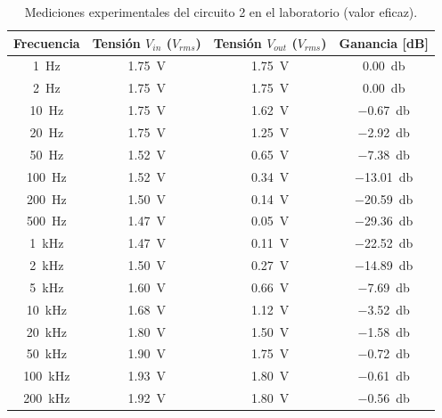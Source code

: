 \begin{table}[H]
  \centering
  \begin{tabular}{cccc}
    \hline
    \textbf{Frecuencia} & \textbf{Tensión $V_{in}$ ($V_{rms}$)} & \textbf{Tensión $V_{out}$ ($V_{rms}$)} & \textbf{Ganancia [dB]} \\ \hline
    \SI{1}{\hertz}       & \SI{1.75}{\volt}                      & \SI{1.75}{\volt}                       & \SI{0.00}{\decibel}    \\
    \SI{2}{\hertz}       & \SI{1.75}{\volt}                      & \SI{1.75}{\volt}                       & \SI{0.00}{\decibel}    \\
    \SI{10}{\hertz}      & \SI{1.75}{\volt}                      & \SI{1.62}{\volt}                       & \SI{-0.67}{\decibel}   \\
    \SI{20}{\hertz}      & \SI{1.75}{\volt}                      & \SI{1.25}{\volt}                       & \SI{-2.92}{\decibel}   \\
    \SI{50}{\hertz}      & \SI{1.52}{\volt}                      & \SI{0.65}{\volt}                       & \SI{-7.38}{\decibel}   \\
    \SI{100}{\hertz}     & \SI{1.52}{\volt}                      & \SI{0.34}{\volt}                       & \SI{-13.01}{\decibel}  \\
    \SI{200}{\hertz}     & \SI{1.50}{\volt}                      & \SI{0.14}{\volt}                       & \SI{-20.59}{\decibel}  \\
    \SI{500}{\hertz}     & \SI{1.47}{\volt}                      & \SI{0.05}{\volt}                       & \SI{-29.36}{\decibel}  \\
    \SI{1}{\kilo\hertz}  & \SI{1.47}{\volt}                      & \SI{0.11}{\volt}                       & \SI{-22.52}{\decibel}  \\
    \SI{2}{\kilo\hertz}  & \SI{1.50}{\volt}                      & \SI{0.27}{\volt}                       & \SI{-14.89}{\decibel}  \\
    \SI{5}{\kilo\hertz}  & \SI{1.60}{\volt}                      & \SI{0.66}{\volt}                       & \SI{-7.69}{\decibel}   \\
    \SI{10}{\kilo\hertz} & \SI{1.68}{\volt}                      & \SI{1.12}{\volt}                       & \SI{-3.52}{\decibel}   \\
    \SI{20}{\kilo\hertz} & \SI{1.80}{\volt}                      & \SI{1.50}{\volt}                       & \SI{-1.58}{\decibel}   \\
    \SI{50}{\kilo\hertz} & \SI{1.90}{\volt}                      & \SI{1.75}{\volt}                       & \SI{-0.72}{\decibel}   \\
    \SI{100}{\kilo\hertz}& \SI{1.93}{\volt}                      & \SI{1.80}{\volt}                       & \SI{-0.61}{\decibel}   \\
    \SI{200}{\kilo\hertz}& \SI{1.92}{\volt}                      & \SI{1.80}{\volt}                       & \SI{-0.56}{\decibel}   \\ \hline
  \end{tabular}
  \caption{Mediciones experimentales del circuito 2 en el laboratorio (valor eficaz).}
  \label{tab:mediciones_circuito_2}
\end{table}

